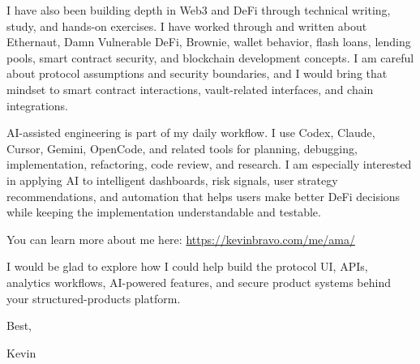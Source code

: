 \documentclass[11pt]{article}
\begin{document}
I have also been building depth in Web3 and DeFi through technical writing, study, and hands-on exercises. I have worked through and written about Ethernaut, Damn Vulnerable DeFi, Brownie, wallet behavior, flash loans, lending pools, smart contract security, and blockchain development concepts. I am careful about protocol assumptions and security boundaries, and I would bring that mindset to smart contract interactions, vault-related interfaces, and chain integrations.

AI-assisted engineering is part of my daily workflow. I use Codex, Claude, Cursor, Gemini, OpenCode, and related tools for planning, debugging, implementation, refactoring, code review, and research. I am especially interested in applying AI to intelligent dashboards, risk signals, user strategy recommendations, and automation that helps users make better DeFi decisions while keeping the implementation understandable and testable.

You can learn more about me here: \href{https://kevinbravo.com/me/ama/}{https://kevinbravo.com/me/ama/}

I would be glad to explore how I could help build the protocol UI, APIs, analytics workflows, AI-powered features, and secure product systems behind your structured-products platform.

Best,

Kevin
\end{document}
